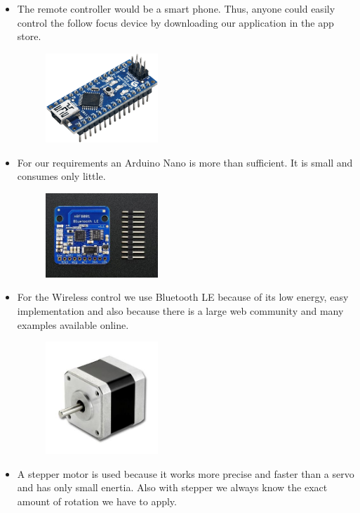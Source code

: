 \documentclass{sigchi}
\begin{document}
\begin{itemize}
\item The remote controller would be a smart phone. Thus, anyone could easily control the follow focus device by downloading our application in the app store.
\begin{figure}
	\includegraphics[width=0.4\textwidth]{nano.png}
\end{figure} 
\item For our requirements an Arduino Nano is more than sufficient. It is small and consumes only little.
\begin{figure}
	\includegraphics[width=0.4\textwidth]{btle.jpg}
\end{figure} 
\item For the Wireless control we use Bluetooth LE because of its low energy, easy implementation and also because there is a large web community and many examples available online.
\begin{figure}
	\includegraphics[width=0.4\textwidth]{stepper.jpg}
\end{figure} 
\item A stepper motor is used because it works more precise and faster than a servo and has only small enertia. Also with stepper we always know the exact amount of rotation we have to apply.

\end{itemize}
\end{document}
